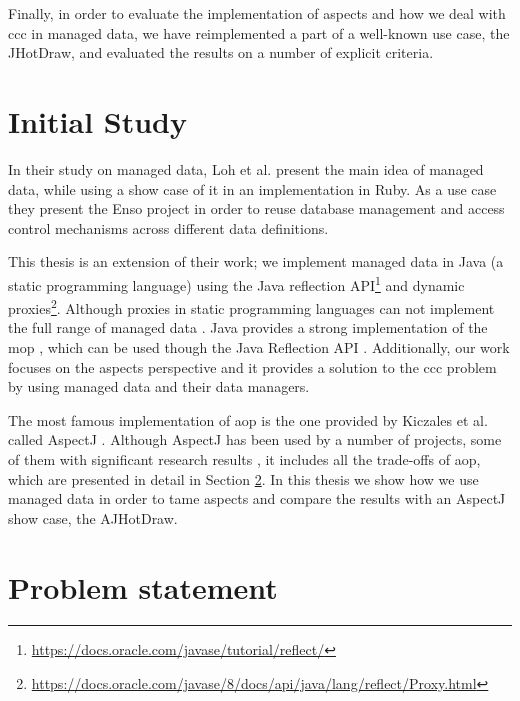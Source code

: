 Finally, in order to evaluate the implementation of aspects and how we deal with \ac{ccc} in managed data, we have reimplemented a part of a well-known use case, the JHotDraw, and evaluated the results on a number of explicit criteria.

\section{Initial Study}\label{Initial Study}
In their study on managed data, Loh et al. \cite{loh2012managed} present the main idea of managed data, while using a show case of it in an implementation in Ruby. As a use case they present the Enso project in order to reuse database management and  access control mechanisms across different data definitions.

This thesis is an extension of their work; we implement managed data in Java (a static programming language) using the Java reflection API\footnote{\url{https://docs.oracle.com/javase/tutorial/reflect/}} and dynamic proxies\footnote{\url{https://docs.oracle.com/javase/8/docs/api/java/lang/reflect/Proxy.html}}. 
Although proxies in static programming languages can not implement the full range of managed data \cite{loh2012managed}. 
Java provides a strong implementation of the \ac{mop} \cite{kiczales1991art}, which can be used though the Java Reflection API \cite{forman2004java}. 
Additionally, our work focuses on the aspects perspective and it provides a solution to the \ac{ccc} problem by using managed data
and their data managers.

The most famous implementation of \ac{aop} is the one provided by Kiczales et al. called AspectJ \cite{kiczales2001overview}. 
Although AspectJ has been used by a number of projects, some of them with significant research results \cite{hannemann2002design} \cite{marinajhotdraw}, it includes all the trade-offs of \ac{aop}, which are presented in detail in Section \ref{Problem statement}. 
In this thesis we show how we use managed data in order to tame aspects and compare the results with an AspectJ show case, the AJHotDraw.

\section{Problem statement}\label{Problem statement}


